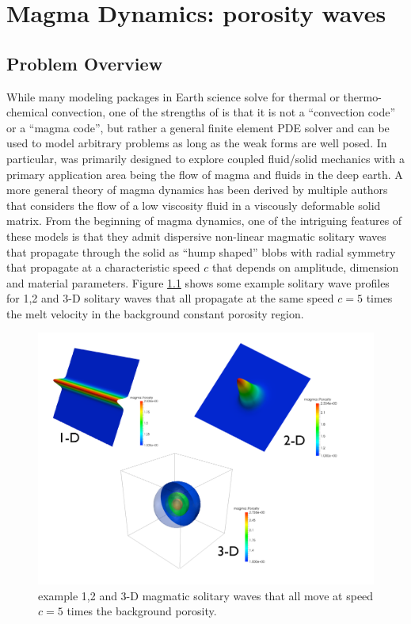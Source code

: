 \chapter{Magma Dynamics: porosity waves}
\label{cha:porosity-waves}

\section{Problem Overview}
\label{sec:porosity_waves-formulation}


While many modeling packages in Earth science solve for thermal or
thermo-chemical convection,  one of the strengths of \TF{} is that it
is not a ``convection code'' or a ``magma code'', but rather a general finite element PDE
solver and can be used to model arbitrary problems as long as the weak
forms are well posed.  In particular,  \TF{} was primarily designed to
explore coupled fluid/solid mechanics with a primary application area
being the flow of magma and fluids in the deep earth.  A more general
theory of magma dynamics has been derived by multiple authors
\cite{mckenzie_generation_1984,scott_magma_1984,scott_magma_1986,spiegelman_flow_1993,spiegelman_flow_1993-1,bercovici_two-phase_2001-1,bercovici_energetics_2003,simpson_multiscale_2010,simpson_multiscale_2010-1}
that considers the flow of a low viscosity fluid in a viscously
deformable solid matrix.  From the beginning of magma dynamics,  one
of the intriguing features of these models is that they admit
dispersive non-linear magmatic
solitary  waves that propagate through the solid as ``hump
shaped'' blobs with radial symmetry that propagate at a characteristic
speed $c$ that depends on amplitude, dimension and material
parameters.  Figure \ref{fig:SolitaryWavesAllD} shows some example
solitary wave profiles for 1,2 and 3-D solitary waves that all
propagate at the same speed $c=5$ times the melt velocity in the
background constant porosity region.  

\begin{figure}[htb!]
  \centering
  \includegraphics[width=.8\textwidth]{figures/CompositeSolitaryWaves.pdf} 
  \caption{example 1,2 and 3-D magmatic solitary waves that all move
    at speed $c=5$ times the background porosity.}
  \label{fig:SolitaryWavesAllD}
\end{figure}

